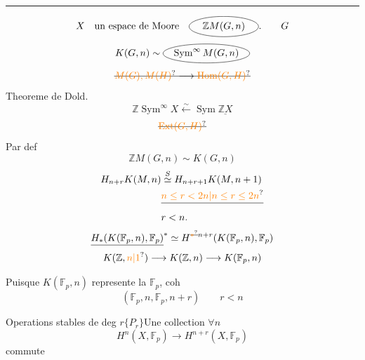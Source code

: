 \begin{center}\rule{1.7cm}{0.35pt}\end{center}
\[
X\quad\text{un espace de Moore}\quad
\tikz[baseline=(a.base)]{\node(a){$\mathbb Z M(G,n)$};\draw(a.center) ellipse (1.25cm and .36cm);}. \qquad G
\]
\[
K(G,n)\sim
\tikz[baseline=(a.base)]{\node(a){$\operatorname{Sym}^{\infty}M(G,n)$};\draw(a.center) ellipse (1.55cm and .35cm);}
\]
\[
\deleted{\unsure{M(G),M(H)}\longrightarrow\unsure{\operatorname{Hom}(G,H)}}
\]
Theoreme de Dold.
\[
\mathbb Z\operatorname{Sym}^{\infty}X\overset{\sim}{\longleftarrow}\operatorname{Sym}\underline{\mathbb Z X}
\]
\[
\deleted{\unsure{\operatorname{Ext}(G,H)}}
\]
 Par def
\[
\mathbb Z M(G,n)\sim K(G,n)
\]
\[
\begin{aligned}
H_{n+r}K(M,n)&\overset{S}{\simeq} H_{n+r+1}K(M,n+1)\\
&\deleted{\unsure{n\leq r<2n|n\leq r\leq 2n}}\\
&r<n .
\end{aligned}
\]
\[
\underline{H_{*}(K(\mathbb F_p,n),\mathbb F_p)}^{*}
\simeq H^{\deleted{\unsure{*}}n+r}(K(\mathbb F_p,n),\mathbb F_p)
\]
\[
K(\mathbb Z,\unsure{n|1})\longrightarrow K(\mathbb Z,n)\longrightarrow K(\mathbb F_p,n)
\]

Puisque $K(\mathbb F_p,n)$ represente la $\mathbb F_p$, coh
\[
(\mathbb F_p,n,\mathbb F_p,n+r)
\qquad r<n
\]

Operations stables de deg $r$\quad $\{P_{r}\}$\quad Une collection $\forall n$
\[
H^n(X,\mathbb F_p)\longrightarrow H^{n+r}(X,\mathbb F_p)
\]
commute

